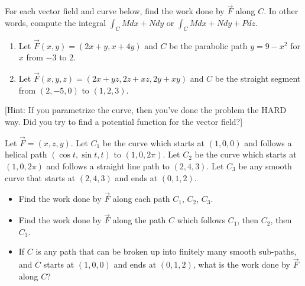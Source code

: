 \begin{problem}
%
For each vector field and curve below, find the work done by $\vec F$ along $C$. In other words, compute the integral $\int_C Mdx+Ndy$ or $\int_C Mdx+Ndy+Pdz$. 
\begin{enumerate}
 \item{}%
 Let $\vec F(x,y) = (2x+y,x+4y)$ and $C$ be the parabolic path $y=9-x^2$ for $x$ from $-3$ to $2$.
 \item{}%
 Let $\vec F(x,y,z) = (2x+yz,2z+xz,2y+xy)$ and $C$ be the straight segment from $(2,-5,0)$ to $(1,2,3)$. 
\end{enumerate}
[Hint: If you parametrize the curve, then you've done the problem the HARD way. Did you try to find a potential function for the vector field?]
\end{problem}

\begin{problem}%
  Let $\vec F = (x,z,y)$. Let $C_1$ be the curve which starts at $(1,0,0)$ and follows a helical path $(\cos t, \sin t, t)$ to $(1,0,2\pi)$. Let $C_2$ be the curve which starts at $(1,0, 2\pi)$ and follows a straight line path to $(2,4,3)$. Let $C_3$ be any smooth curve that starts at $(2,4,3)$ and ends at $(0,1,2)$.
 \begin{itemize}
  \item Find the work done by $\vec F$ along each path $C_1$, $C_2$, $C_3$. 
  \item Find the work done by $\vec F$ along the path $C$ which follows $C_1$, then $C_2$, then $C_3$.  
  \item If $C$ is any path that can be broken up into finitely many smooth sub-paths, and $C$ starts at $(1,0,0)$ and ends at $(0,1,2)$, what is the work done by $\vec F$ along $C$?
 \end{itemize}
\end{problem}

